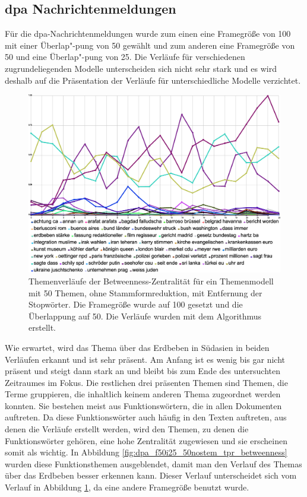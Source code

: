 \subsection{dpa Nachrichtenmeldungen}
Für die dpa-Nachrichtenmeldungen wurde zum einen eine Framegröße von 100 mit einer Überlap"-pung von 50 gewählt und zum anderen eine Framegröße von 50 und eine Überlap"-pung von 25. Die Verläufe für verschiedenen zugrundeliegenden Modelle unterscheiden sich nicht sehr stark und es wird deshalb auf die Präsentation der Verläufe für unterschiedliche Modelle verzichtet.
\begin{figure}[ht]
\centering
\includegraphics[width=\textwidth]{images/content/06_results/runs/dpa_f100i50_50nostem_betweenness.eps} 
\caption{Themenverläufe der Betweenness-Zentralität für ein Themenmodell mit 50 Themen, ohne Stammformreduktion, mit Entfernung der Stopwörter. Die Framegröße wurde auf 100 gesetzt und die Überlappung auf 50. Die Verläufe wurden mit dem Algorithmus \TPR$\;$erstellt.}
\label{fig:dpa_f100i50_50nostem_tpr_betweenness}
\end{figure}

Wie erwartet, wird das Thema über das Erdbeben in Südasien in beiden Verläufen erkannt und ist sehr präsent. Am Anfang ist es wenig bis gar nicht präsent und steigt dann stark an und bleibt bis zum Ende des untersuchten Zeitraumes im Fokus. Die restlichen drei präsenten Themen sind Themen, die  Terme gruppieren, die inhaltlich keinem anderen Thema zugeordnet werden konnten. Sie bestehen meist aus Funktionswörtern, die in allen Dokumenten auftreten. Da diese Funktionswörter auch häufig in den Texten auftreten, aus denen die Verläufe erstellt werden, wird den Themen, zu denen die Funktionswörter gehören, eine hohe Zentralität zugewiesen und sie erscheinen somit als wichtig. In Abbildung \ref{fig:dpa_f50i25_50nostem_tpr_betweenness} wurden diese Funktionsthemen ausgeblendet, damit man den Verlauf des Themas über das Erdbeben besser erkennen kann. Dieser Verlauf unterscheidet sich vom Verlauf in Abbildung \ref{fig:dpa_f100i50_50nostem_tpr_betweenness}, da eine andere Framegröße benutzt wurde.

